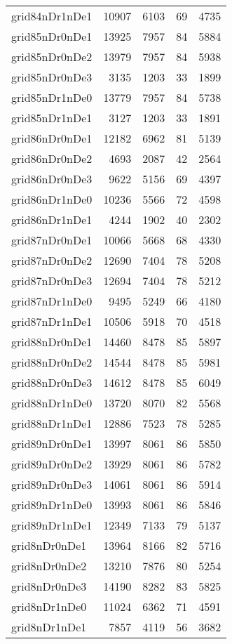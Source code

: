 \begin{longtable}{lrrrr}
grid84nDr1nDe1 & 10907 & 6103 & 69 & 4735 \\
grid85nDr0nDe1 & 13925 & 7957 & 84 & 5884 \\
grid85nDr0nDe2 & 13979 & 7957 & 84 & 5938 \\
grid85nDr0nDe3 & 3135 & 1203 & 33 & 1899 \\
grid85nDr1nDe0 & 13779 & 7957 & 84 & 5738 \\
grid85nDr1nDe1 & 3127 & 1203 & 33 & 1891 \\
grid86nDr0nDe1 & 12182 & 6962 & 81 & 5139 \\
grid86nDr0nDe2 & 4693 & 2087 & 42 & 2564 \\
grid86nDr0nDe3 & 9622 & 5156 & 69 & 4397 \\
grid86nDr1nDe0 & 10236 & 5566 & 72 & 4598 \\
grid86nDr1nDe1 & 4244 & 1902 & 40 & 2302 \\
grid87nDr0nDe1 & 10066 & 5668 & 68 & 4330 \\
grid87nDr0nDe2 & 12690 & 7404 & 78 & 5208 \\
grid87nDr0nDe3 & 12694 & 7404 & 78 & 5212 \\
grid87nDr1nDe0 & 9495 & 5249 & 66 & 4180 \\
grid87nDr1nDe1 & 10506 & 5918 & 70 & 4518 \\
grid88nDr0nDe1 & 14460 & 8478 & 85 & 5897 \\
grid88nDr0nDe2 & 14544 & 8478 & 85 & 5981 \\
grid88nDr0nDe3 & 14612 & 8478 & 85 & 6049 \\
grid88nDr1nDe0 & 13720 & 8070 & 82 & 5568 \\
grid88nDr1nDe1 & 12886 & 7523 & 78 & 5285 \\
grid89nDr0nDe1 & 13997 & 8061 & 86 & 5850 \\
grid89nDr0nDe2 & 13929 & 8061 & 86 & 5782 \\
grid89nDr0nDe3 & 14061 & 8061 & 86 & 5914 \\
grid89nDr1nDe0 & 13993 & 8061 & 86 & 5846 \\
grid89nDr1nDe1 & 12349 & 7133 & 79 & 5137 \\
grid8nDr0nDe1 & 13964 & 8166 & 82 & 5716 \\
grid8nDr0nDe2 & 13210 & 7876 & 80 & 5254 \\
grid8nDr0nDe3 & 14190 & 8282 & 83 & 5825 \\
grid8nDr1nDe0 & 11024 & 6362 & 71 & 4591 \\
grid8nDr1nDe1 & 7857 & 4119 & 56 & 3682 \\

\end{longtable}
